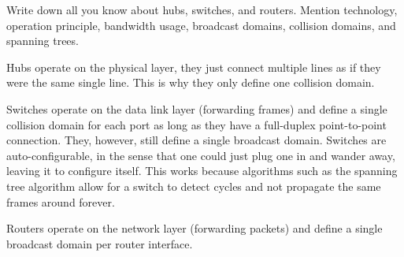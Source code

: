 \begin{Exercise}
Write down all you know about hubs, switches, and routers.
Mention technology, operation principle, bandwidth usage, broadcast domains, collision domains, and spanning trees.
\end{Exercise}
\begin{Answer}
Hubs operate on the physical layer, they just connect multiple lines as if they were the same single line. This is why they only define one collision domain.

Switches operate on the data link layer (forwarding frames) and define a single collision domain for each port as long as they have a full-duplex point-to-point connection.
They, however, still define a single broadcast domain.
Switches are auto-configurable, in the sense that one could just plug one in and wander away, leaving it to configure itself.
This works because algorithms such as the spanning tree algorithm allow for a switch to detect cycles and not propagate the same frames around forever.

Routers operate on the network layer (forwarding packets) and define a single broadcast domain per router interface.
\end{Answer}

